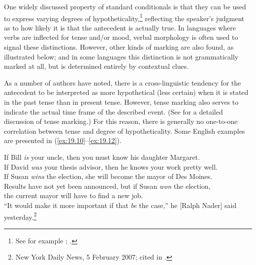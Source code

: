 One widely discussed property of standard conditionals is that they can be used to express varying degrees of hypotheticality,\footnote{See for example \citet{Comrie1986}; \citet{ThompsonEtAl2007}.} reflecting the speaker’s judgment as to how likely it is that the antecedent is actually true. In languages where verbs are inflected for tense and/or mood, verbal morphology is often used to signal these distinctions. However, other kinds of marking are also found, as illustrated below; and in some languages this distinction is not grammatically marked at all, but is determined entirely by contextual clues.



As a number of authors have noted, there is a cross-linguistic tendency for the antecedent to be interpreted as more hypothetical (less certain) when it is stated in the past tense than in present tense. However, tense marking also serves to indicate the actual time frame of the described event. (See  for a detailed discussion of tense marking.) For this reason, there is generally no one-to-one correlation between tense and degree of hypotheticality. Some English examples are presented in (\ref{ex:19.10}--\ref{ex:19.12}).


\ea \label{ex:19.10}
\ea  If Bill \textit{is} your uncle, then you must know his daughter Margaret.\\
\ex If David \textit{was} your thesis advisor, then he knows your work pretty well.\\
\ex If Susan \textit{wins} the election, she will become the mayor of Des Moines.\\
\ex Results have not yet been announced, but if Susan \textit{won} the election,\\
  the current mayor will have to find a new job.\\
\ex ``It would make it more important if that \textit{be} the case,'' he [Ralph Nader] said yesterday.\footnote{New York Daily News, 5  February 2007; cited in \citet{Gomes2008}.}
                       \z
\z


